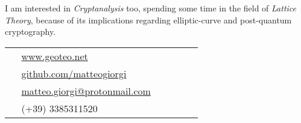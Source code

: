 \documentclass[10pt]{article} %
\begin{document}
\begin{paracol}{2}
\medskip
I am interested in \textit{Cryptanalysis} too, spending some time in the field of \textit{Lattice Theory}, because of its implications regarding elliptic-curve and post-quantum cryptography.





\switchcolumn %


\parbox[top][0.12\textheight][c]{\linewidth}{ %
	\vspace{-0.04\textheight} %
	\colorbox{shade}{ %
		\begin{supertabular}{p{0.05\linewidth}|p{0.775\linewidth}} %
			\raisebox{-1pt}{\faGlobe} & \href{https://www.geoteo.net}{www.geoteo.net} \\ %
            \raisebox{-1pt}{\faGithub} & \href{https://github.com/matteogiorgi}{github.com/matteogiorgi} \\ %
			\raisebox{-1pt}{\faEnvelopeSquare} & \href{mailto:matteo.giorgi@protonmail.com}{matteo.giorgi@protonmail.com} \\ %
			\raisebox{-1pt}{\faPhoneSquare} & (+39) 3385311520 \\ %
		\end{supertabular}
	}
}



\end{paracol}
\end{document}
